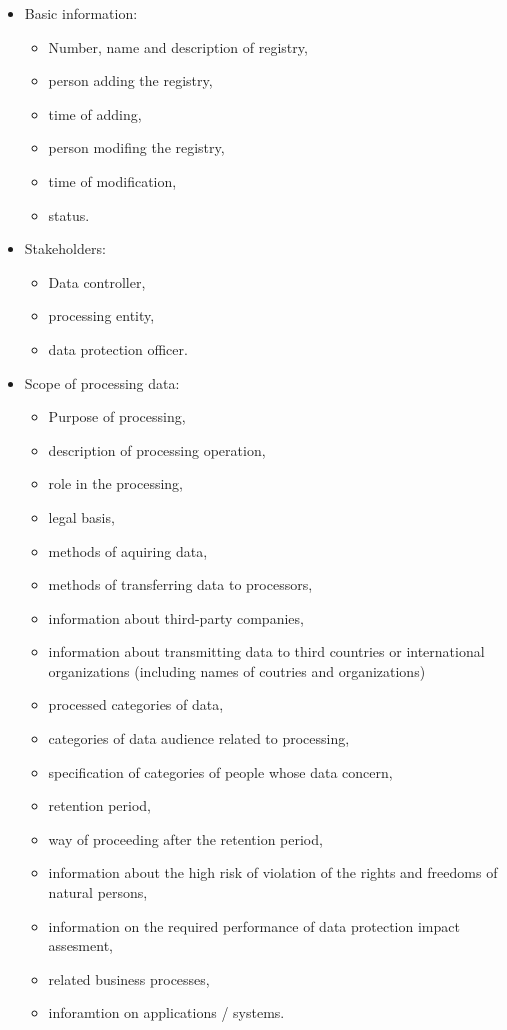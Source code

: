 \documentclass[en, noamssymb]{mgr}
\begin{document}
\begin{itemize}

\item Basic information:

\begin{itemize}

\item Number, name and description of registry,
\item person adding the registry,
\item time of adding,
\item person modifing the registry,
\item time of modification,
\item status.

\end{itemize}

\item Stakeholders:

\begin{itemize}

\item Data controller,
\item processing entity,
\item data protection officer.

\end{itemize}

\item Scope of processing data:

\begin{itemize}

\item Purpose of processing,
\item description of processing operation,
\item role in the processing,
\item legal basis,
\item methods of aquiring data,
\item methods of transferring data to processors,
\item information about third-party companies,
\item information about transmitting data to third countries or international organizations (including names of coutries and organizations)
\item processed categories of data,
\item categories of data audience related to processing,
\item specification of categories of people whose data concern,
\item retention period,
\item way of proceeding after the retention period,
\item information about the high risk of violation of the rights and freedoms of natural persons,
\item information on the required performance of data protection impact assesment,
\item related business processes,
\item inforamtion on applications / systems.


\end{itemize}
\end{itemize}
\end{document}
